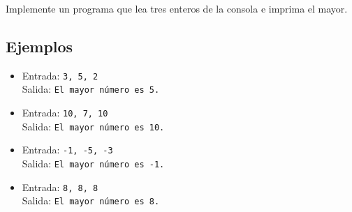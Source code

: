 Implemente un programa que lea tres enteros de la consola e imprima el mayor.
\subsection*{Ejemplos}
\begin{itemize}
    \item Entrada: \texttt{3, 5, 2}\\
          Salida: \texttt{El mayor número es 5.}
    \item Entrada: \texttt{10, 7, 10}\\
          Salida: \texttt{El mayor número es 10.}
    \item Entrada: \texttt{-1, -5, -3}\\
          Salida: \texttt{El mayor número es -1.}
    \item Entrada: \texttt{8, 8, 8}\\
          Salida: \texttt{El mayor número es 8.}
\end{itemize}